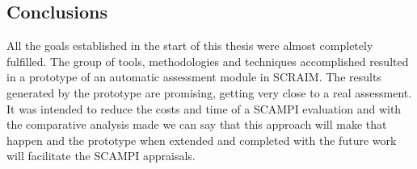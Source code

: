 \documentclass[9pt,a4paper]{extarticle}
\begin{document}
\begin{multicols}{2}
\subsection{Conclusions}
All the goals established in the start of this thesis were almost completely fulfilled. The group of tools, methodologies and techniques accomplished resulted in a prototype of an automatic assessment module in SCRAIM. The results generated by the prototype are promising, getting very close to a real assessment.
It was intended to reduce the costs and time of a SCAMPI evaluation and with the comparative analysis made we can say that this approach will make that happen and the prototype when extended and completed with the future work will facilitate the SCAMPI appraisals.




\end{multicols}
\end{document}

